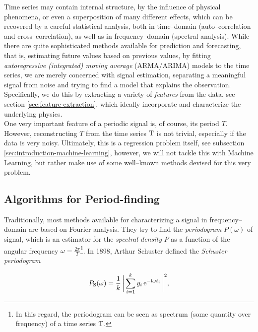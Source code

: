Time series may contain internal structure, \eg by the influence of physical phenomena, or even a superposition of many different effects, which can be recovered by a careful statistical analysis, both in time--domain (auto--correlation and cross--correlation), as well as in frequency--domain (spectral analysis). While there are quite sophisticated methods available for prediction and forecasting, that is, estimating future values based on previous values, \eg by fitting \emph{autoregressive (integrated) moving average} (ARMA/ARIMA) models to the time series, we are merely concerned with signal estimation, \ie separating a meaningful signal from noise and trying to find a model that explains the observation. Specifically, we do this by extracting a variety of \emph{features} from the data, see section \ref{sec:feature-extraction}, which ideally incorporate and characterize the underlying physics.\\

One very important feature of a periodic signal is, of course, its period $T$. However, reconstructing $T$ from the time series $\mathrm{T}$ is not trivial, especially if the data is very noisy. Ultimately, this is a regression problem itself, see subsection \ref{sec:introduction-machine-learning}, however, we will not tackle this with Machine Learning, but rather make use of some well--known methods devised for this very problem.

\subsection{Algorithms for Period-finding}
\label{subsec:period-finding}

Traditionally, most methods available for characterizing a signal in frequency--domain are based on Fourier analysis. They try to find the \emph{periodogram} $P(\omega)$ of signal, which is an estimator for the \emph{spectral density} $P$ as a function of the angular frequency $\omega = \frac{2 \pi}{T}$\footnote{In this regard, the periodogram can be seen as spectrum (some quantity over frequency) of a time series $\mathrm{T}$.}. In 1898, Arthur Schuster defined the \emph{Schuster periodogram}

\begin{equation}
\label{eg:schuster-periodogram}
P_{\text{S}}(\omega) = \frac{1}{k} \, \biggl| \, \sum\limits_{i=1}^{k} y_i \, \mathrm{e}^{-\mathrm{i} \omega t_i} \, \biggr|^2,
\end{equation}


